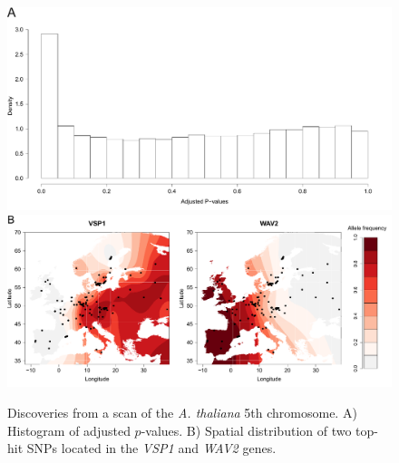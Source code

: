 \begin{figure}[h!]\centering
\includegraphics[width=\linewidth]{FinalGraphs/pValueHist.pdf}
\includegraphics[width=\linewidth]{FinalGraphs/colorBar.pdf}
\caption{ Discoveries from a scan of the {\it A. thaliana} 5th chromosome. A) Histogram of adjusted $p$-values. B) Spatial distribution of two top-hit SNPs located in the {\it VSP1} and {\it WAV2} genes.}
\end{figure}    


\clearpage
\newpage 
